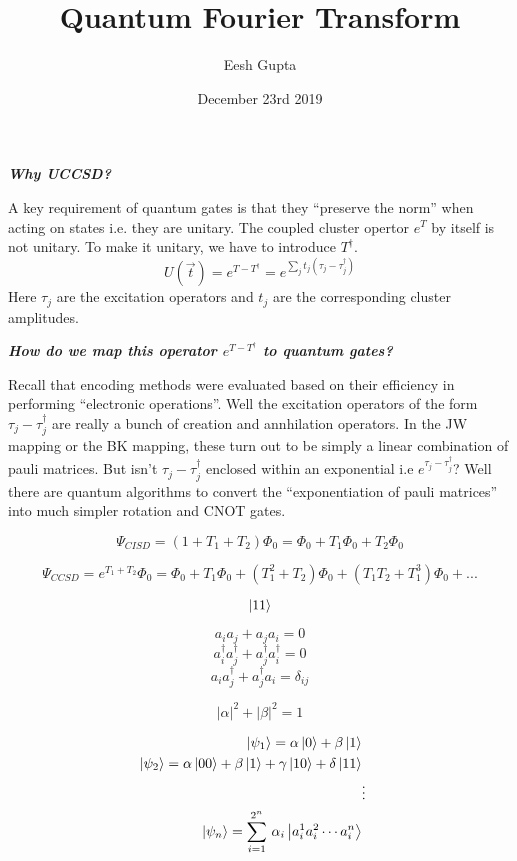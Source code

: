 \documentclass{article}
\title{Quantum Fourier Transform}
\author{Eesh Gupta }
\date{December 23rd 2019}
\begin{document}
\maketitle

\textbf{\textit{Why UCCSD? }}

A key requirement of quantum gates is that they “preserve the norm” when acting on states i.e. they are unitary. The coupled cluster opertor \(e^T\) by
itself is not unitary. To make it unitary, we have to introduce \(T^{\dagger}\).
\[ U(\vec{t}) = e^{T-T^{\dagger}} = e^{\sum_j t_j(\tau_j -\tau_j^{\dagger})}\]
Here \(\tau_j\) are the excitation operators and \(t_j\) are the corresponding cluster amplitudes.

\textbf{\textit{How do we map this operator \(e^{T-T^{\dagger}}\) to quantum gates?}}

Recall that encoding methods were evaluated based on their efficiency in performing ``electronic
operations''. Well the excitation operators of the
form \(\tau_j -\tau_j^{\dagger}\) are really a bunch of creation and annhilation operators.
In the JW mapping or the BK mapping, these turn out to be simply a linear combination of
pauli matrices. But isn't \(\tau_j -\tau_j^{\dagger}\) enclosed within an exponential i.e
\(e^{\tau_j -\tau_j^{\dagger}}\)? Well there are quantum algorithms to convert the
``exponentiation of pauli matrices'' into much simpler rotation and CNOT gates.



\[\Psi_{CISD} = (1 + T_1 + T_2)\Phi_0 = \Phi_0 + T_1\Phi_0 + T_2\Phi_0\]

\[\Psi_{CCSD} = e^{T_1 + T_2}\Phi_0 = \Phi_0 + T_1\Phi_0 + (T_1^2 + T_2)\Phi_0 + (T_1T_2 + T_1^3)\Phi_0 + ...\]

\[\ket{11}\]

  \[a_{i}a_j + a_{j}a_i = 0\]
  \[a^{\dagger}_{i}a^{\dagger}_j + a^{\dagger}_{j}a^{\dagger}_i = 0\]
  \[a_{i}a^{\dagger}_j + a^{\dagger}_{j}a_i = \delta_{ij}\]

\newcommand{\sumi}[2]{\sum\limits_{#1}^{#2}}

\[|\alpha|^2 + |\beta|^2 = 1\]

\newpage
\[
\begin{align*}
   \ket{\psi_1} = \alpha\ket{0} + \beta\ket{1} \\
   \ket{\psi_2} = \alpha\ket{00} + \beta\ket{1} + \gamma\ket{10} + \delta\ket{11} \\
   &\vdots\\
   \ket{\psi_n} = \sumi{i=1}{2^n}\, \alpha_i\ket{a_i^1a_i^2\cdots a_i^n}
\end{align*}
\]
\end{document}
